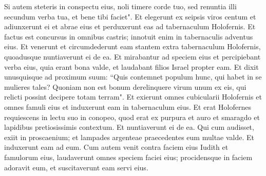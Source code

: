 \begin{biblechapter}
\verse Si autem steteris in conspectu eius, noli timere corde tuo, sed renuntia illi secundum verba tua, et bene tibi faciet". 
\verse Et elegerunt ex seipsis viros centum et adiunxerunt ei et abrae eius et perduxerunt eas ad tabernaculum Holofernis. 
\verse Et factus est concursus in omnibus castris; innotuit enim in tabernaculis adventus eius. Et venerunt et circumdederunt eam stantem extra tabernaculum Holofernis, quoadusque nuntiaverunt ei de ea. 
\verse Et mirabantur ad speciem eius et percipiebant verba eius, quia erant bona valde, et laudabant filios Israel propter eam. Et dixit unusquisque ad proximum suum: “Quis contemnet populum hunc, qui habet in se mulieres tales? Quoniam non est bonum derelinquere virum unum ex eis, qui relicti possint decipere totam terram". 
\verse Et exierunt omnes cubicularii Holofernis et omnes famuli eius et induxerunt eam in tabernaculum eius. 
\verse Et erat Holofernes requiescens in lectu suo in conopeo, quod erat ex purpura et auro et smaragdo et lapidibus pretiosissimis contextum. 
\verse Et nuntiaverunt ei de ea. Qui cum audisset, exiit in proscaenium; et lampades argenteae praecedentes eum multae valde. Et induxerunt eam ad eum. 
\verse Cum autem venit contra faciem eius Iudith et famulorum eius, laudaverunt omnes speciem faciei eius; procidensque in faciem adoravit eum, et suscitaverunt eam servi eius. 
\end{biblechapter}

